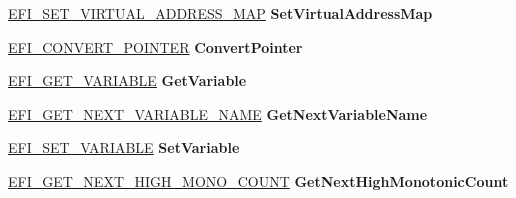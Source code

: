 \begin{DoxyCompactItemize}
\item 
\mbox{\label{struct_e_f_i___r_u_n_t_i_m_e___s_e_r_v_i_c_e_s_ae0aa57ba6c1f29c6357fede8eba469c4}} 
\hyperlink{_uefi_spec_8h_accb3bf08a31ab1ea83465b40d8469be5}{E\+F\+I\+\_\+\+S\+E\+T\+\_\+\+V\+I\+R\+T\+U\+A\+L\+\_\+\+A\+D\+D\+R\+E\+S\+S\+\_\+\+M\+AP} {\bfseries Set\+Virtual\+Address\+Map}
\item 
\mbox{\label{struct_e_f_i___r_u_n_t_i_m_e___s_e_r_v_i_c_e_s_a1c6a389df33c333e0650e82f56da727e}} 
\hyperlink{_uefi_spec_8h_a73fa51da724d04c62403db30446ef211}{E\+F\+I\+\_\+\+C\+O\+N\+V\+E\+R\+T\+\_\+\+P\+O\+I\+N\+T\+ER} {\bfseries Convert\+Pointer}
\item 
\mbox{\label{struct_e_f_i___r_u_n_t_i_m_e___s_e_r_v_i_c_e_s_aecaa32074884fbc4a13406a670d822ad}} 
\hyperlink{_uefi_spec_8h_aab046e1f3645995176c1b5fb88a36285}{E\+F\+I\+\_\+\+G\+E\+T\+\_\+\+V\+A\+R\+I\+A\+B\+LE} {\bfseries Get\+Variable}
\item 
\mbox{\label{struct_e_f_i___r_u_n_t_i_m_e___s_e_r_v_i_c_e_s_a7bd159319a05aef9840c0679e58857ec}} 
\hyperlink{_uefi_spec_8h_ae771f0f8967692958bb016e10e3ecd5c}{E\+F\+I\+\_\+\+G\+E\+T\+\_\+\+N\+E\+X\+T\+\_\+\+V\+A\+R\+I\+A\+B\+L\+E\+\_\+\+N\+A\+ME} {\bfseries Get\+Next\+Variable\+Name}
\item 
\mbox{\label{struct_e_f_i___r_u_n_t_i_m_e___s_e_r_v_i_c_e_s_a4cac2b8bf60a507f3236334fde190048}} 
\hyperlink{_uefi_spec_8h_a802f6646c762803fe91a0afdf632ad9f}{E\+F\+I\+\_\+\+S\+E\+T\+\_\+\+V\+A\+R\+I\+A\+B\+LE} {\bfseries Set\+Variable}
\item 
\mbox{\label{struct_e_f_i___r_u_n_t_i_m_e___s_e_r_v_i_c_e_s_a8321edf6c28aae25fbcdea22f0ad2995}} 
\hyperlink{_uefi_spec_8h_a27d6a4553d64aad7260f3d60f3ea8e2a}{E\+F\+I\+\_\+\+G\+E\+T\+\_\+\+N\+E\+X\+T\+\_\+\+H\+I\+G\+H\+\_\+\+M\+O\+N\+O\+\_\+\+C\+O\+U\+NT} {\bfseries Get\+Next\+High\+Monotonic\+Count}
\item 
\mbox{\label{struct_e_f_i___r_u_n_t_i_m_e___s_e_r_v_i_c_e_s_af5b27851e9f286e2233e655216386979}} 

\end{DoxyCompactItemize}
